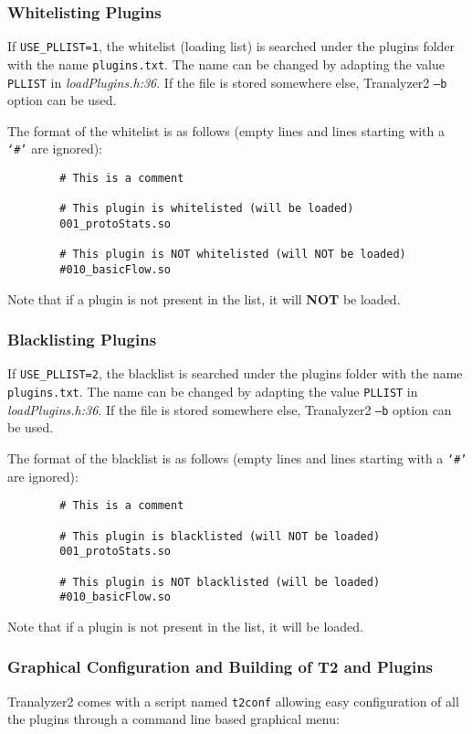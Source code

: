 \subsubsection{Whitelisting Plugins}
If {\tt USE\_PLLIST=1}, the whitelist (loading list) is searched under the plugins folder with the name {\tt plugins.txt}.
The name can be changed by adapting the value {\tt PLLIST} in {\em loadPlugins.h:36}.
If the file is stored somewhere else, Tranalyzer2 {\tt --b} option can be used.

The format of the whitelist is as follows (empty lines and lines starting with a {\tt `\#'} are ignored):
\begin{verbatim}
        # This is a comment

        # This plugin is whitelisted (will be loaded)
        001_protoStats.so

        # This plugin is NOT whitelisted (will NOT be loaded)
        #010_basicFlow.so
\end{verbatim}

Note that if a plugin is not present in the list, it will {\bf NOT} be loaded.

\subsubsection{Blacklisting Plugins}
If {\tt USE\_PLLIST=2}, the blacklist is searched under the plugins folder with the name {\tt plugins.txt}.
The name can be changed by adapting the value {\tt PLLIST} in {\em loadPlugins.h:36}.
If the file is stored somewhere else, Tranalyzer2 {\tt --b} option can be used.

The format of the blacklist is as follows (empty lines and lines starting with a {\tt `\#'} are ignored):
\begin{verbatim}
        # This is a comment

        # This plugin is blacklisted (will NOT be loaded)
        001_protoStats.so

        # This plugin is NOT blacklisted (will be loaded)
        #010_basicFlow.so
\end{verbatim}

Note that if a plugin is not present in the list, it will be loaded.

\subsubsection{Graphical Configuration and Building of T2 and Plugins}\label{sss:t2conf}
Tranalyzer2 comes with a script named {\tt t2conf} allowing easy configuration of all the plugins through a command line based graphical menu:

